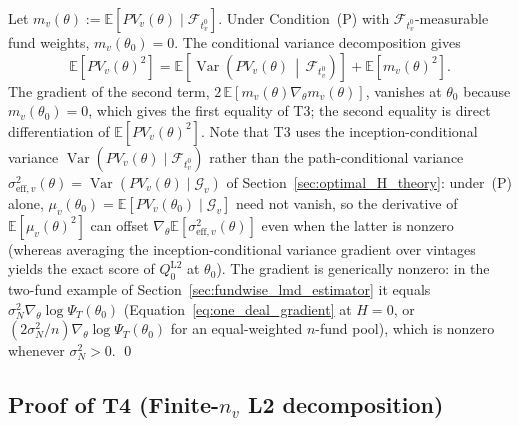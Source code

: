 Let $m_v(\theta) := \mathbb{E}[PV_v(\theta)\mid\mathcal{F}_{t_v^0}]$. Under Condition~(P) with $\mathcal{F}_{t_v^0}$-measurable fund weights, $m_v(\theta_0) = 0$. The conditional variance decomposition gives
\[
\mathbb{E}\!\left[PV_v(\theta)^2\right] = \mathbb{E}\!\left[\operatorname{Var}\!\left(PV_v(\theta)\,\middle|\,\mathcal{F}_{t_v^0}\right)\right] + \mathbb{E}\!\left[m_v(\theta)^2\right].
\]
The gradient of the second term, $2\,\mathbb{E}[m_v(\theta)\nabla_\theta m_v(\theta)]$, vanishes at $\theta_0$ because $m_v(\theta_0) = 0$, which gives the first equality of T3; the second equality is direct differentiation of $\mathbb{E}[PV_v(\theta)^2]$. Note that T3 uses the inception-conditional variance $\operatorname{Var}(PV_v(\theta)\mid\mathcal{F}_{t_v^0})$ rather than the path-conditional variance $\sigma_{\mathrm{eff},v}^2(\theta) = \operatorname{Var}(PV_v(\theta)\mid\mathcal{G}_v)$ of Section~\ref{sec:optimal_H_theory}: under~(P) alone, $\mu_v(\theta_0) = \mathbb{E}[PV_v(\theta_0)\mid\mathcal{G}_v]$ need not vanish, so the derivative of $\mathbb{E}[\mu_v(\theta)^2]$ can offset $\nabla_\theta\mathbb{E}[\sigma_{\mathrm{eff},v}^2(\theta)]$ even when the latter is nonzero (whereas averaging the inception-conditional variance gradient over vintages yields the exact score of $Q_0^{\mathrm{L2}}$ at $\theta_0$). The gradient is generically nonzero: in the two-fund example of Section~\ref{sec:fundwise_lmd_estimator} it equals $\sigma_N^2\nabla_\theta\log\Psi_T(\theta_0)$ (Equation~\eqref{eq:one_deal_gradient} at $H=0$, or $(2\sigma_N^2/n)\nabla_\theta\log\Psi_T(\theta_0)$ for an equal-weighted $n$-fund pool), which is nonzero whenever $\sigma_N^2 > 0$. \qed

\subsection{Proof of T4 (Finite-$n_v$ L2 decomposition)}
\label{sec:proof_T4}

